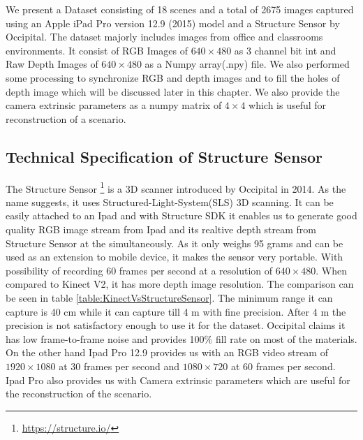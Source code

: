 We present a Dataset consisting of 18 scenes and a total of 2675 images captured using an Apple iPad Pro version 12.9 (2015) model and a Structure Sensor by Occipital. The dataset majorly includes images from office and classrooms environments. It consist of RGB Images of $640\times480$ as 3 channel  bit int and Raw Depth Images of $640\times480$ as a Numpy array(.npy) file. We also performed some processing to synchronize RGB and depth images and to fill the holes of depth image which will be discussed later in this chapter. We also provide the camera extrinsic parameters as a numpy matrix of $4\times4$ which is useful for reconstruction of a scenario.\\


\subsection{Technical Specification of Structure Sensor}
The Structure Sensor \footnote{\url{https://structure.io/}} is a 3D scanner introduced by Occipital in 2014. As the name suggests, it uses Structured-Light-System(SLS) 3D scanning\cite{Kalantari}. It can be easily attached to an Ipad and with Structure SDK it enables us to generate good quality RGB image stream from Ipad and its realtive depth stream from Structure Sensor at the simultaneously. As it only weighs 95 grams and can be used as an extension to mobile device, it makes the sensor very portable. With possibility of recording 60 frames per second at a resolution of $640\times480$\cite{Kalantari}. When compared to Kinect V2, it has more depth image resolution. The comparison can be seen in table \ref{table:KinectVsStructureSensor}. The minimum range it can capture is 40 cm while it can capture till 4 m with fine precision. After 4 m the precision is not satisfactory enough to use it for the dataset. Occipital claims it has low frame-to-frame noise and provides 100\% fill rate on most of the materials. On the other hand Ipad Pro 12.9 provides us with an RGB video stream of $1920\times1080$ at 30 frames per second and $1080\times720$ at 60 frames per second. Ipad Pro also provides us with Camera extrinsic parameters which are useful for the reconstruction of the scenario.\\

